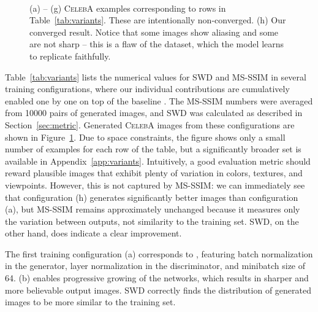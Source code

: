 \begin{figure}

\hfill
\hfill
\hfill
\hfill
\hfill
\hfill
\hfill
\hfill
\\
\hfill
{}\hfill
{}\hfill
{}\hfill
{}\hfill
{}\hfill
{}\hfill
{}\hfill
{}

\caption{
(a) -- (g) \textsc{CelebA} examples corresponding to rows in Table~\protect\ref{tab:variants}. These are intentionally non-converged. (h) Our converged result.
Notice that some images show aliasing and some are not sharp -- this is a flaw of the dataset, which the model learns to replicate faithfully.
}
\label{fig:variants}
\end{figure}

Table~\ref{tab:variants} lists the numerical values for SWD and MS-SSIM in several training configurations, where our individual contributions are cumulatively enabled one by one on top of the baseline \citep{Gulrajani2017}. The MS-SSIM numbers were averaged from 10000 pairs of generated images, and SWD was calculated as described in Section~\ref{sec:metric}. Generated \textsc{CelebA} images from these configurations are shown in Figure~\ref{fig:variants}.
Due to space constraints, the figure shows only a small number of examples for each row of the table, but a significantly broader set is available in Appendix~\ref{app:variants}. 
Intuitively, a good evaluation metric should reward plausible images that exhibit plenty of variation in colors, textures, and viewpoints. However, this is not captured by MS-SSIM: we can immediately see that configuration (h) generates significantly better images than configuration (a), but MS-SSIM remains approximately unchanged because it measures only the variation between outputs, not similarity to the training set. SWD, on the other hand, does indicate a clear improvement.

The first training configuration (a) corresponds to \cite{Gulrajani2017}, featuring batch normalization in the generator, layer normalization in the discriminator, and minibatch size of 64. (b) enables progressive growing of the networks, which results in sharper and more believable output images. SWD correctly finds the distribution of generated images to be more similar to the training set.

